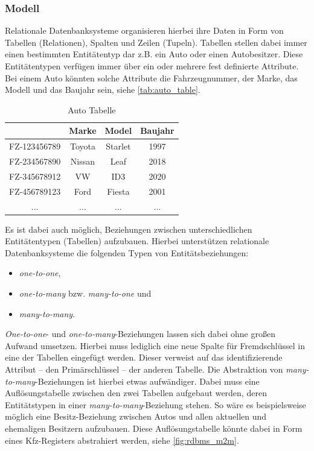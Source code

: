 \subsubsection{Modell}
Relationale Datenbanksysteme organisieren hierbei ihre Daten in Form von Tabellen (Relationen), Spalten und Zeilen (Tupeln). Tabellen stellen dabei immer einen bestimmten Entitätentyp dar z.B. ein Auto oder einen Autobesitzer. Diese Entitätentypen verfügen immer über ein oder mehrere fest definierte Attribute. Bei einem Auto könnten solche Attribute die Fahrzeugnummer, der Marke, das Modell und das Baujahr sein, siehe \autoref{tab:auto_table}. 

\begin{table}[h]
    \centering
    \begin{tabular}{c|c|c|c}
    \hline
    \rowcolor[HTML]{EFEFEF} 
    \multicolumn{1}{l|}{\cellcolor[HTML]{EFEFEF}\textbf{Fahrzeugnummer}} & \multicolumn{1}{l|}{\cellcolor[HTML]{EFEFEF}\textbf{Marke}} & \multicolumn{1}{l|}{\cellcolor[HTML]{EFEFEF}\textbf{Model}} & \multicolumn{1}{l}{\cellcolor[HTML]{EFEFEF}\textbf{Baujahr}} \\ \hline
    FZ-123456789 & Toyota & Starlet & 1997 \\
    FZ-234567890 & Nissan & Leaf & 2018 \\
    FZ-345678912 & VW & ID3 & 2020 \\
    FZ-456789123 & Ford & Fiesta & 2001 \\
    ... & ... & ... & ... \\ \hline
    \end{tabular}
    \caption{Auto Tabelle}
    \label{tab:auto_table}
\end{table}

Es ist dabei auch möglich, Beziehungen zwischen unterschiedlichen Entitätentypen (Tabellen) aufzubauen. Hierbei unterstützen relationale Datenbanksysteme die folgenden Typen von Entitätsbeziehungen: 
\begin{itemize}
    \item \textit{one-to-one}, 
    \item \textit{one-to-many} bzw. \textit{many-to-one} und 
    \item \textit{many-to-many}.
\end{itemize}
\textit{One-to-one}- und \textit{one-to-many}-Beziehungen lassen sich dabei ohne großen Aufwand umsetzen. Hierbei muss lediglich eine neue Spalte für Fremdschlüssel in eine der Tabellen eingefügt werden. Dieser verweist auf das identifizierende Attribut -- den Primärschlüssel -- der anderen Tabelle. Die Abstraktion von \textit{many-to-many}-Beziehungen ist hierbei etwas aufwändiger. Dabei muss eine Auflösungstabelle zwischen den zwei Tabellen aufgebaut werden, deren Entitätstypen in einer \textit{many-to-many}-Beziehung stehen. So wäre es beispielsweise möglich eine Besitz-Beziehung zwischen Autos und allen aktuellen und ehemaligen Besitzern aufzubauen. Diese Auflösungstabelle könnte dabei in Form eines Kfz-Registers abstrahiert werden, siehe \autoref{fig:rdbms_m2m}.

